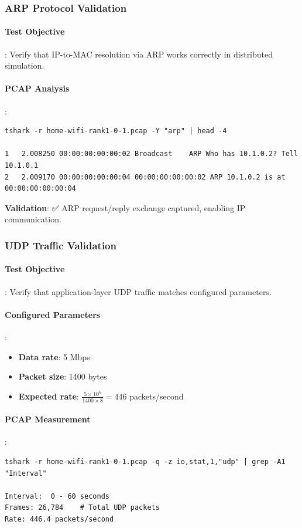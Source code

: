 \subsubsection{ARP Protocol Validation}

\paragraph{Test Objective}:
Verify that IP-to-MAC resolution via ARP works correctly in distributed simulation.

\paragraph{PCAP Analysis}:
\begin{lstlisting}[style=bash]
tshark -r home-wifi-rank1-0-1.pcap -Y "arp" | head -4

1   2.008250 00:00:00:00:00:02 Broadcast    ARP Who has 10.1.0.2? Tell 10.1.0.1
2   2.009170 00:00:00:00:00:04 00:00:00:00:00:02 ARP 10.1.0.2 is at 00:00:00:00:00:04
\end{lstlisting}

\textbf{Validation}: ✅ ARP request/reply exchange captured, enabling IP communication.

\subsubsection{UDP Traffic Validation}

\paragraph{Test Objective}:
Verify that application-layer UDP traffic matches configured parameters.

\paragraph{Configured Parameters}:
\begin{itemize}
    \item \textbf{Data rate}: 5 Mbps
    \item \textbf{Packet size}: 1400 bytes
    \item \textbf{Expected rate}: $\frac{5 \times 10^6}{1400 \times 8} = 446$ packets/second
\end{itemize}

\paragraph{PCAP Measurement}:
\begin{lstlisting}[style=bash]
tshark -r home-wifi-rank1-0-1.pcap -q -z io,stat,1,"udp" | grep -A1 "Interval"

Interval:  0 - 60 seconds
Frames: 26,784    # Total UDP packets
Rate: 446.4 packets/second
\end{lstlisting}

